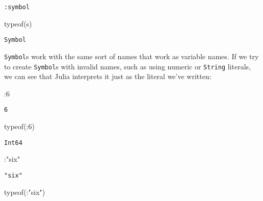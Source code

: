 \documentclass[
  letterpaper,
  DIV=11,
  numbers=noendperiod]{scrreprt}
\newenvironment{Shaded}{\begin{snugshade}}{\end{snugshade}}
\newcommand{\FloatTok}[1]{\textcolor[rgb]{0.68,0.00,0.00}{#1}}
\newcommand{\FunctionTok}[1]{\textcolor[rgb]{0.28,0.35,0.67}{#1}}
\newcommand{\NormalTok}[1]{\textcolor[rgb]{0.00,0.23,0.31}{#1}}
\newcommand{\OperatorTok}[1]{\textcolor[rgb]{0.37,0.37,0.37}{#1}}
\newcommand{\StringTok}[1]{\textcolor[rgb]{0.13,0.47,0.30}{#1}}
\begin{document}
\begin{verbatim}
:symbol
\end{verbatim}

\begin{Shaded}
\begin{Highlighting}[]
\FunctionTok{typeof}\NormalTok{(s)}
\end{Highlighting}
\end{Shaded}

\begin{verbatim}
Symbol
\end{verbatim}

\texttt{Symbol}s work with the same sort of names that work as variable
names. If we try to create \texttt{Symbol}s with invalid names, such as
using numeric or \texttt{String} literals, we can see that Julia
interprets it just as the literal we've written:

\begin{Shaded}
\begin{Highlighting}[]
\OperatorTok{:}\FloatTok{6}
\end{Highlighting}
\end{Shaded}

\begin{verbatim}
6
\end{verbatim}

\begin{Shaded}
\begin{Highlighting}[]
\FunctionTok{typeof}\NormalTok{(}\OperatorTok{:}\FloatTok{6}\NormalTok{)}
\end{Highlighting}
\end{Shaded}

\begin{verbatim}
Int64
\end{verbatim}

\begin{Shaded}
\begin{Highlighting}[]
\OperatorTok{:}\StringTok{"six"}
\end{Highlighting}
\end{Shaded}

\begin{verbatim}
"six"
\end{verbatim}

\begin{Shaded}
\begin{Highlighting}[]
\FunctionTok{typeof}\NormalTok{(}\OperatorTok{:}\StringTok{"six"}\NormalTok{)}
\end{Highlighting}
\end{Shaded}
\end{document}
